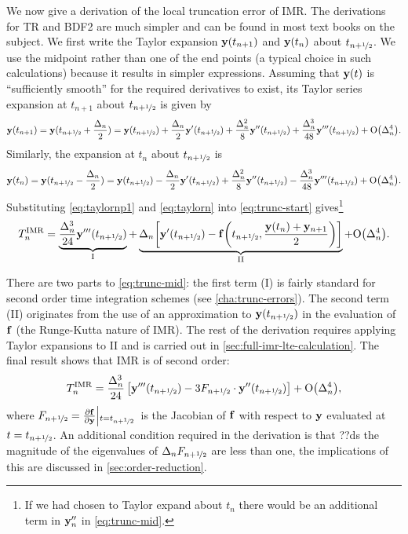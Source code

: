 We now give a derivation of the local truncation error of IMR. 
The derivations for TR and BDF2 are much simpler and can be found in most text books on the subject.
We first write the Taylor expansion $\mathbf{y}(t_{n+1})$ and $\mathbf{y}(t_{n})$ about $t_{n+\nicefrac{1}{2}}$.
We use the midpoint rather than one of the end points (a typical choice in such calculations) because it results in simpler expressions.
Assuming that $\mathbf{y}(t)$ is ``sufficiently smooth'' for the required derivatives to exist, its Taylor series expansion at $t_{n+1}$ about $t_{n+\nicefrac{1}{2}}$ is given by
\begin{equation}
  \yv(t_{n+1}) = \yv(\thf + \frac{\dtn}{2}) = \yvhf + \frac{\dtn}{2} \yvhf['] 
  + \frac{\dtn^2}{8} \yvhf['']
  + \frac{\dtn^3}{48} \yvhf[''']
  + \order{\dtn^4}.
  \label{eq:taylornp1}
\end{equation}
Similarly, the expansion at $t_n$ about $t_{n+\nicefrac{1}{2}}$ is
\begin{equation}
  \yv(t_n) = \yv(\thf - \frac{\dtn}{2}) = \yvhf - \frac{\dtn}{2} \yvhf['] 
  + \frac{\dtn^2}{8} \yvhf[''] 
  - \frac{\dtn^3}{48} \yvhf['''] 
  + \order{\dtn^4}.
  \label{eq:taylorn}
\end{equation}
Substituting \cref{eq:taylornp1} and \cref{eq:taylorn} into \cref{eq:trunc-start} gives\footnote{If we had chosen to Taylor expand about $t_n$ there would be an additional term in $\mathbf{y}_n''$ in \cref{eq:trunc-mid}.}
\begin{equation}
  \lte^\imr = \underbrace{\frac{\dtn^3}{24} \yvhf[''']}_{\text{I}}
  + \underbrace{\dtn\bigs{ \yvhf['] - \ffv{\thf, \frac{\yv(t_n) + \yv_{n+1}}{2}} }}_{\text{II}}
  + \order{\dtn^4}.
  \label{eq:trunc-mid}
\end{equation}

There are two parts to \cref{eq:trunc-mid}: the first term (I) is fairly standard for second order time integration schemes (see \eg \cref{cha:trunc-errors}).
The second term (II) originates from the use of an approximation to $\mathbf{y}(t_{n+\nicefrac{1}{2}})$ in the evaluation of ${\mathbf{f}}$ (\ie the Runge-Kutta nature of IMR).
The rest of the derivation requires applying Taylor expansions to II and is carried out in \cref{sec:full-imr-lte-calculation}.
The final result shows that IMR is of second order:
\begin{equation}
  \lte^\imr = \frac{\dtn^3}{24} \left[\yvhf['''] - 3 \dfdyhf \cdot \yvhf[''] \right]
  + \order{\dtn^4},
  \label{eq:trunc-final}
\end{equation}
where $F_{n+\nicefrac{1}{2}} = \frac{\partial {\mathbf{f}}}{\partial \mathbf{y}}{\left|_{t=t_{n+\nicefrac{1}{2}}}\right.}$ is the Jacobian of ${\mathbf{f}}$ with respect to $\mathbf{y}$ evaluated at $t=t_{n+\nicefrac{1}{2}}$.
An additional condition required in the derivation is that ??ds the magnitude of the eigenvalues of $\Delta_{n}F_{n+\nicefrac{1}{2}}$ are less than one, the implications of this are discussed in \cref{sec:order-reduction}.

